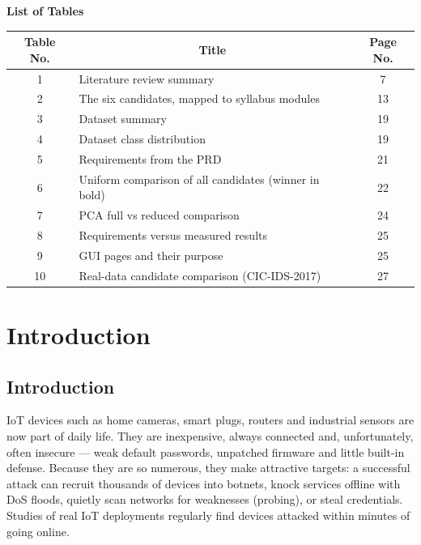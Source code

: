 \documentclass[12pt,a4paper]{article}
\begin{document}
\vspace{0.8cm}

\begin{center}
    \textbf{\Large List of Tables}
\end{center}

\vspace{0.3cm}

\begin{center}
\renewcommand{\arraystretch}{1.15}
\noindent
\begin{tabular}{|c|p{10.1cm}|c|}
\hline
\textbf{Table No.} & \multicolumn{1}{c|}{\textbf{Title}} & \textbf{Page No.} \\
\hline
1 & Literature review summary & 7 \\
\hline
2 & The six candidates, mapped to syllabus modules & 13 \\
\hline
3 & Dataset summary & 19 \\
\hline
4 & Dataset class distribution & 19 \\
\hline
5 & Requirements from the PRD & 21 \\
\hline
6 & Uniform comparison of all candidates (winner in bold) & 22 \\
\hline
7 & PCA full vs reduced comparison & 24 \\
\hline
8 & Requirements versus measured results & 25 \\
\hline
9 & GUI pages and their purpose & 25 \\
\hline
10 & Real-data candidate comparison (CIC-IDS-2017) & 27 \\
\hline
\end{tabular}
\end{center}

\clearpage

\section{Introduction}

\subsection{Introduction}
IoT devices such as home cameras, smart plugs, routers and industrial sensors are now
part of daily life. They are inexpensive, always connected and, unfortunately, often
insecure --- weak default passwords, unpatched firmware and little built-in defense.
Because they are so numerous, they make attractive targets: a successful attack can
recruit thousands of devices into botnets, knock services offline with DoS floods,
quietly scan networks for weaknesses (probing), or steal credentials. Studies of real
IoT deployments regularly find devices attacked within minutes of going online.
\end{document}
